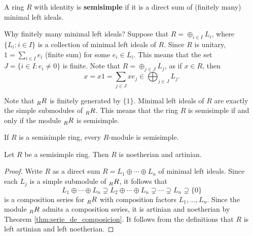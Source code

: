 \begin{definition}
    A ring $R$ with identity is \textbf{semisimple} if it is a direct sum of (finitely many) 
    minimal left ideals. 
\end{definition}

Why finitely many minimal left ideals?
Suppose that $R=\oplus_{i\in I}L_i$, where $\{L_i:i\in I\}$ is a collection of
minimal left ideals of $R$. 
Since $R$ is unitary, $1=\sum_{i\in I}e_i$ (finite sum) for 
some $e_i\in L_i$. This means that the set $J=\{i\in I:e_i\ne 0\}$ is finite.
Note that $R=\oplus_{j\in J}L_j$, as 
if $x\in R$, then 
\[
x=x1=\sum_{j\in J}xe_j\in \bigoplus_{j\in J}L_j.
\]

Note
that $\prescript{}{R}{R}$ is finitely generated by $\{1\}$. Minimal left ideals of $R$ 
are exactly the simple submodules of $\prescript{}{R}{R}$. 
This means that 
the ring $R$ is semisimple if and only if the module
$\prescript{}{R}{R}$ is semisimple.  

\begin{exercise}
\label{xca:semisimple}
    If $R$ is a semisimple ring, every $R$-module is semisimple. 
\end{exercise}


\begin{proposition}
    Let $R$ be a semisimple ring. Then $R$ is noetherian and artinian.
\end{proposition}

\begin{proof}
    Write $R$ as a direct sum $R=L_1\oplus\cdots\oplus L_n$ of minimal left ideals. Since 
    each $L_j$ is a simple submodule of $\prescript{}{R}{R}$, it follows that 
    \[
    L_1\oplus\cdots\oplus L_n\supsetneq L_2\oplus\cdots\oplus L_n\supsetneq\cdots\supsetneq L_n\supsetneq\{0\}
    \]
    is a composition series for $\prescript{}{R}{R}$ with composition factors
    $L_1,\dots,L_n$. Since the module $\prescript{}{R}{R}$ admits a composition
    series, it is artinian and noetherian by Theorem \ref{thm:serie_de_composicion}. It follows
    from the definitions that $R$ is left artinian and left noetherian. 
\end{proof}


